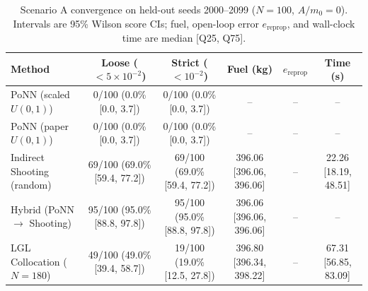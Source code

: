 \begin{table}[t]
\centering
\caption{Scenario A convergence on held-out seeds 2000--2099 ($N=100$, $A/m_0=0$). Intervals are 95\% Wilson score CIs; fuel, open-loop error $e_{\mathrm{reprop}}$, and wall-clock time are median [Q25, Q75].}
\label{tab:scenario_a_convergence}
\begin{tabular}{lccccc}
\toprule
Method & Loose ($<5\times 10^{-2}$) & Strict ($<10^{-2}$) & Fuel (kg) & $e_{\mathrm{reprop}}$ & Time (s) \\
\midrule
PoNN (scaled $U(0,1)$) & 0/100 (0.0\% [0.0, 3.7]) & 0/100 (0.0\% [0.0, 3.7]) & -- & -- & -- \\
PoNN (paper $U(0,1)$) & 0/100 (0.0\% [0.0, 3.7]) & 0/100 (0.0\% [0.0, 3.7]) & -- & -- & -- \\
Indirect Shooting (random) & 69/100 (69.0\% [59.4, 77.2]) & 69/100 (69.0\% [59.4, 77.2]) & 396.06 [396.06, 396.06] & -- & 22.26 [18.19, 48.51] \\
Hybrid (PoNN $\to$ Shooting) & 95/100 (95.0\% [88.8, 97.8]) & 95/100 (95.0\% [88.8, 97.8]) & 396.06 [396.06, 396.06] & -- & -- \\
LGL Collocation ($N=180$) & 49/100 (49.0\% [39.4, 58.7]) & 19/100 (19.0\% [12.5, 27.8]) & 396.80 [396.34, 398.22] & -- & 67.31 [56.85, 83.09] \\
\bottomrule
\end{tabular}
\end{table}
